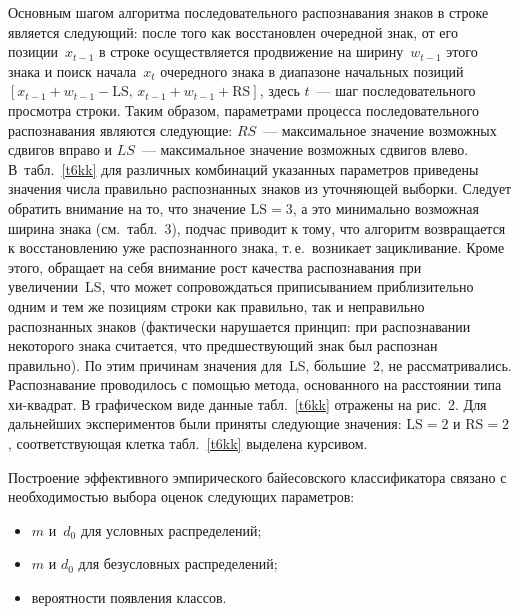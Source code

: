 \begin{multicols}{2}
      Основным шагом алгоритма последовательного распознавания знаков в строке является 
следующий: после того как восстановлен очередной знак, от его позиции~$x_{t-1}$ в строке 
осуществляется продвижение на ширину~$w_{t-1}$ этого знака и поиск начала~$x_t$ очередного 
знака в диапазоне начальных позиций $[x_{t-1}+w_{t-1}-\mathrm{LS},\,x_{t-1}+w_{t-1}+\mathrm{RS}]$, здесь $t$~--- 
шаг последовательного просмотра строки. Таким образом, параметрами процесса 
последовательного распознавания являются следующие: $RS$~--- максимальное значение 
возможных сдвигов вправо и $LS$~--- максимальное значение возможных сдвигов влево. 
В~табл.~\ref{t6kk} для различных комбинаций указанных параметров приведены значения числа 
правильно распознанных знаков из уточняющей выборки. Следует обратить внимание на то, что 
значение $\mathrm{LS}=3$, а это минимально возможная ширина знака (см.\ табл.~3), подчас 
приводит к тому, что алгоритм возвращается к восстановлению уже распознанного знака, т.\,е.\ 
возникает зацикливание. Кроме этого, обращает на себя внимание рост качества распознавания 
при увеличении~LS, что может сопровождаться приписыванием приблизительно одним и тем же 
позициям строки как правильно, так и неправильно распознанных знаков (фактически нарушается 
принцип: при распознавании некоторого знака считается, что предшествующий знак был 
распознан правильно). По этим причинам значения для~LS, б$\acute{\mbox{о}}$льшие~2, не 
рассматривались. Распознавание проводилось с помощью метода, основанного на расстоянии типа 
хи-квадрат. В графическом виде данные табл.~\ref{t6kk} отражены на рис.~2. Для 
дальнейших экспериментов были приняты следующие значения: $\mathrm{LS}=2$ и $\mathrm{RS}=2$, 
соответствующая клетка табл.~\ref{t6kk} выделена курсивом. 

     
      Построение эффективного эмпирического байесовского классификатора связано с 
необходимостью выбора оценок следующих параметров:
      \begin{itemize}
      \item $m$ и~$d_0$ для условных распределений;
\item $m$ и  $d_0$ для безусловных распределений;
\item вероятности появления классов.
\end{itemize}


\end{multicols}
